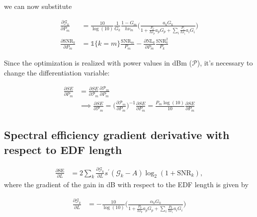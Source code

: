 \documentclass[a4paper]{article}
\begin{document}
we can now substitute

\begin{align}
	\frac{\partial\mathcal{G}_k}{\partial P_m} &= \frac{10}{\log(10)}\frac{1}{G_k}\frac{1 - G_m}{h\nu_m}\Bigg(\frac{a_kG_k}{1 + \frac{P_p}{h\nu_p}a_pG_p + \sum_i\frac{P_i}{h\nu_i}a_iG_i }\Bigg) \\
	\frac{\partial\mathrm{SNR}_k}{\partial P_m} &= \mathds{1}\{k= m\}\frac{\mathrm{SNR}_m}{P_m} - \frac{\partial \mathrm{NL}_k}{\partial P_m}\frac{\mathrm{SNR}_k^2}{P_k}
\end{align}

Since the optimization is realized with power values in dBm ($\mathcal{P}$), it's necessary to change the differentiation variable:

\begin{align} \nonumber
\frac{\partial SE}{\partial P_m} &= \frac{\partial SE}{\partial \mathcal{P}_m}\frac{\partial\mathcal{P}_m}{\partial P_m} \\
&\implies \frac{\partial SE}{\partial \mathcal{P}_m} =  \bigg(\frac{\partial\mathcal{P}_m}{\partial P_m}\bigg)^{-1}\frac{\partial SE}{\partial P_m} = \frac{P_m\log(10)}{10}\frac{\partial SE}{\partial P_m}
\end{align}

\subsection{Spectral efficiency gradient derivative with respect to EDF length}

\begin{align} 
\frac{\partial \mathrm{SE}}{\partial L} &= 2\sum_k\frac{\partial \mathcal{G}_k}{\partial L}s^{\prime}(\mathcal{G}_k-A)\log_2(1 + \mathrm{SNR}_k),
\end{align}
where the gradient of the gain in dB with respect to the EDF length is given by

\begin{align}
\frac{\partial \mathcal{G}_k}{\partial L} &= -\frac{10}{\log(10)}\bigg(\frac{\alpha_kG_k}{1 + \frac{P_p}{h\nu_p}a_pG_p + \sum_{i}\frac{P_k}{h\nu_i}a_iG_i}\bigg)
\end{align}


%
\end{document}
